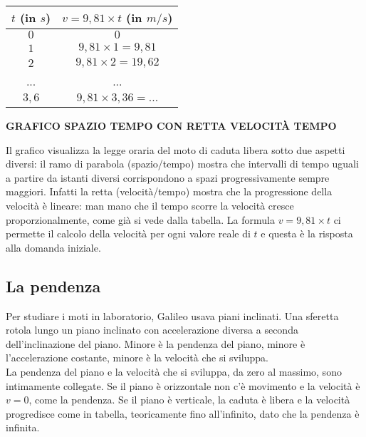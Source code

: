 \begin{minipage}{0.48\textwidth}
 \begin{center}
\begin{tabular}{cc}\toprule
\(t\) (in \(s\)) & \(v=9,81\times t\) (in \(m/s\)) \\\midrule
\(0\) & \(0\)  \\
\(1\) & \(9,81\times 1 =9,81\) \\
\(2\) & \(9,81\times 2 =19,62\) \\
... & ... \\
\(3,6\) & \(9,81\times 3,36= ...\)\\\bottomrule
\end{tabular}
\label{tab:diff_velocita}
\end{center}
\end{minipage}
 \hfill
\begin{minipage}{.48 \textwidth}
 \begin{center}
\textbf{GRAFICO SPAZIO TEMPO CON RETTA VELOCITÀ TEMPO}
 \end{center}
\end{minipage}

Il grafico visualizza la legge oraria del 
moto di caduta libera sotto due aspetti diversi: il ramo di parabola 
(spazio/tempo) mostra che intervalli di tempo uguali a partire da istanti 
diversi corrispondono a spazi progressivamente sempre maggiori. 
Infatti la retta (velocità/tempo) mostra che la progressione della 
velocità è lineare: man mano che il tempo 
scorre la velocità cresce proporzionalmente, come già si vede dalla tabella.
La formula \(v=9,81\times t\) ci permette il calcolo della velocità per 
ogni valore reale di \(t\) e questa è la risposta alla domanda iniziale. 

\subsection{La pendenza}
\label{subsec:differenziazione_pendenza}
Per studiare i moti in laboratorio, Galileo usava piani inclinati. Una sferetta 
rotola lungo un piano inclinato con accelerazione diversa a seconda 
dell'inclinazione del piano. Minore è la pendenza del piano, minore è 
l'accelerazione costante, minore è la velocità che si sviluppa. \\
La pendenza del 
piano e la velocità che si sviluppa, da zero al massimo, sono intimamente 
collegate. Se il piano è orizzontale non c'è movimento e la velocità è 
\(v=0\), come la pendenza. Se il piano è verticale, la caduta è libera e  
la velocità progredisce come in tabella, teoricamente fino all'infinito, dato 
che la pendenza è infinita.

